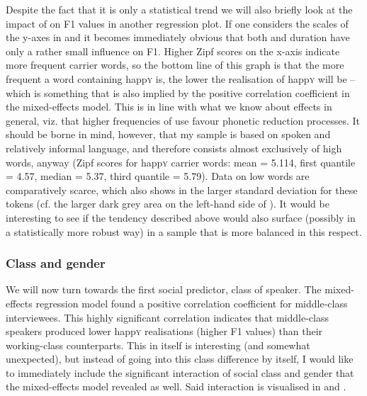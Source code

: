 Despite the fact that it is only a statistical trend we will also briefly look at the impact of  on F1 values in another regression plot.
If one considers the scales of the y-axes in  and  it becomes immediately obvious that both  and duration have only a rather small influence on F1.
Higher Zipf scores on the x-axis indicate more frequent carrier words, so the bottom line of this graph is that the more frequent a word containing happ\textsc{y} is, the lower the realisation of happ\textsc{y} will be -- which is something that is also implied by the positive correlation coefficient in the mixed-effects model.
This is in line with what we know about  effects in general, viz. that higher frequencies of use favour phonetic reduction processes.
It should be borne in mind, however, that my sample is based on spoken and relatively informal language, and therefore consists almost exclusively of high  words, anyway (Zipf scores for happ\textsc{y} carrier words: mean = 5.114, first quantile = 4.57, median = 5.37, third quantile = 5.79).
Data on low  words are comparatively scarce, which also shows in the larger standard deviation for these tokens (cf. the larger dark grey area on the left-hand side of ).
It would be interesting to see if the tendency described above would also surface (possibly in a statistically more robust way) in a sample that is more balanced in this respect.

			\subsubsection{Class and gender}
			\label{sec.prod.res.vow.happy.f1.classgender}

We will now turn towards the first social predictor, class of speaker.
The mixed-effects regression model found a positive correlation coefficient for middle-class interviewees.
This highly significant correlation indicates that middle-class speakers produced lower happ\textsc{y} realisations (higher F1 values) than their working-class counterparts.
This in itself is interesting (and somewhat unexpected), but instead of going into this class difference by itself, I would like to immediately include the significant interaction of social class and gender that the mixed-effects model revealed as well.
Said interaction is visualised in  and .

